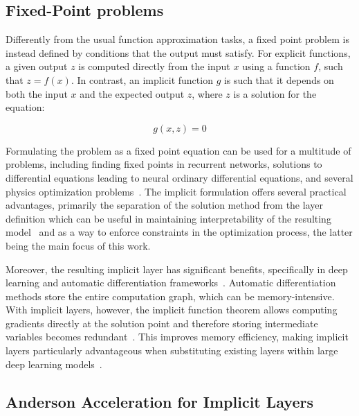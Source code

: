 \subsection{Fixed-Point problems}
\label{subsec:implicit}

Differently from the usual function approximation tasks, a fixed point problem is instead defined by conditions that the output must satisfy.
For explicit functions, a given output $z$ is computed directly from the input $x$ using a function $f$, such that $z = f(x)$.
In contrast, an implicit function  $g$ is such that it depends on both the input $x$ and the expected output $z$,
where $z$ is a solution for the equation:

\begin{equation}
    \label{eq:fixed_point}
    g(x, z) = 0
\end{equation}

Formulating the problem as a fixed point equation can be used for a multitude of problems, including finding fixed points in recurrent networks,
solutions to differential equations leading to neural ordinary differential equations, and several physics optimization problems~\cite{Chen2019}.
The implicit formulation offers several practical advantages, primarily the separation of the solution method from the layer
definition which can be useful in maintaining interpretability of the resulting model~\cite{Kawaguchi2021} and as a way to enforce constraints in the optimization process,
the latter being the main focus of this work.

Moreover, the resulting implicit layer has significant benefits, specifically in deep learning and automatic differentiation frameworks~\cite{Massaroli2021,Kolter2020}.
Automatic differentiation methods store the entire computation graph, which can be memory-intensive.
With implicit layers, however, the implicit function theorem allows computing gradients directly at the solution point and
therefore storing intermediate variables becomes redundant~\cite{Massaroli2021}.
This improves memory efficiency, making implicit layers particularly advantageous when substituting existing layers within large deep learning models~\cite{Li2020}.

\subsection{Anderson Acceleration for Implicit Layers}
\label{subsec:anderson}

